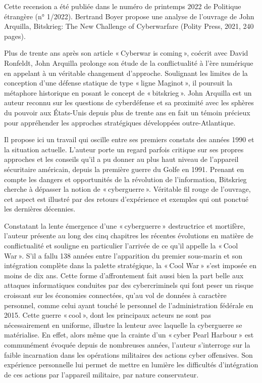 


Cette recension a été publiée dans le numéro de printemps 2022 de Politique étrangère (n° 1/2022). Bertrand Boyer propose une analyse de l’ouvrage de John Arquilla, Bitskrieg: The New Challenge of Cyberwarfare (Polity Press, 2021, 240 pages).



Plus de trente ans après son article « Cyberwar is coming », coécrit avec David Ronfeldt, John Arquilla prolonge son étude de la conflictualité à l’ère numérique en appelant à un véritable changement d’approche. Soulignant les limites de la conception d’une défense statique de type « ligne Maginot », il poursuit la métaphore historique en posant le concept de « bitskrieg ». John Arquilla est un auteur reconnu sur les questions de cyberdéfense et sa proximité avec les sphères du pouvoir aux États-Unis depuis plus de trente ans en fait un témoin précieux pour appréhender les approches stratégiques développées outre-Atlantique.

Il propose ici un travail qui oscille entre ses premiers constats des années 1990 et la situation actuelle. L’auteur porte un regard parfois critique sur ses propres approches et les conseils qu’il a pu donner au plus haut niveau de l’appareil sécuritaire américain, depuis la première guerre du Golfe en 1991. Prenant en compte les dangers et opportunités de la révolution de l’information, Bitskrieg cherche à dépasser la notion de « cyberguerre ». Véritable fil rouge de l’ouvrage, cet aspect est illustré par des retours d’expérience et exemples qui ont ponctué les dernières décennies.

Constatant la lente émergence d’une « cyberguerre » destructrice et mortifère, l’auteur présente au long des cinq chapitres les récentes évolutions en matière de conflictualité et souligne en particulier l’arrivée de ce qu’il appelle la « Cool War ». S’il a fallu 138 années entre l’apparition du premier sous-marin et son intégration complète dans la palette stratégique, la « Cool War » s’est imposée en moins de dix ans. Cette forme d’affrontement fait aussi bien la part belle aux attaques informatiques conduites par des cybercriminels qui font peser un risque croissant sur les économies connectées, qu’au vol de données à caractère personnel, comme celui ayant touché le personnel de l’administration fédérale en 2015. Cette guerre « cool », dont les principaux acteurs ne sont pas nécessairement en uniforme, illustre la lenteur avec laquelle la cyberguerre se matérialise. En effet, alors même que la crainte d’un « cyber Pearl Harbour » est communément évoquée depuis de nombreuses années, l’auteur s’interroge sur la faible incarnation dans les opérations militaires des actions cyber offensives. Son expérience personnelle lui permet de mettre en lumière les difficultés d’intégration de ces actions par l’appareil militaire, par nature conservateur.

